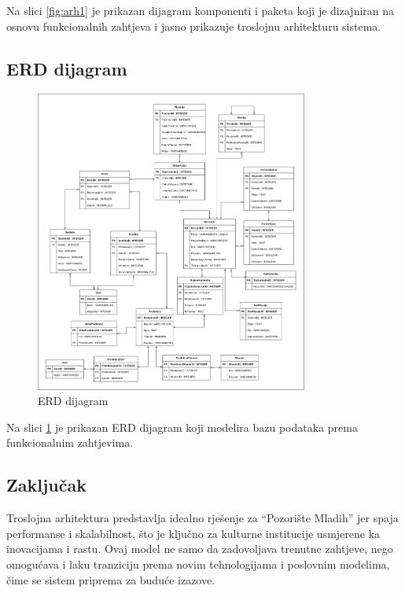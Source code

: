 Na slici \ref{fig:arh1} je prikazan dijagram komponenti i paketa koji je dizajniran na osnovu funkcionalnih zahtjeva i jasno prikazuje troslojnu arhitekturu sistema.

\subsection{ERD dijagram}

\begin{figure}[H]
    \centering
    \includegraphics[width=0.8\textwidth]{Slike/Arhitektura/ERD.png}
    \caption{ERD dijagram}
    \label{fig:arh2}
\end{figure}

Na slici \ref{fig:arh2} je prikazan ERD dijagram koji modelira bazu podataka prema funkcionalnim zahtjevima.

\subsection{Zaključak}

Troslojna arhitektura predstavlja idealno rješenje za \textquotedblleft Pozorište Mladih\textquotedblright{} jer spaja performanse i skalabilnost, što je ključno za kulturne institucije usmjerene ka inovacijama i rastu. Ovaj model ne samo da zadovoljava trenutne zahtjeve, nego omogućava i laku tranziciju prema novim tehnologijama i poslovnim modelima, čime se sistem priprema za buduće izazove.

